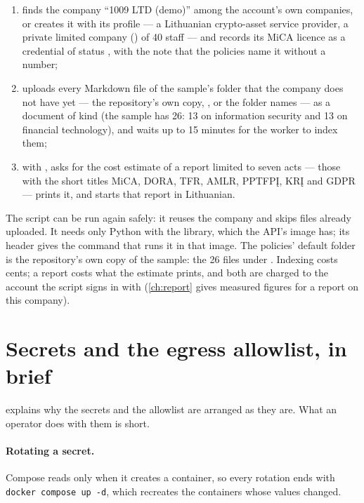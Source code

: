 \begin{enumerate}
  \item finds the company \enquote{1009 LTD (demo)} among the account's own companies, or
    creates it with its profile --- a Lithuanian crypto-asset service provider, a private
    limited company () of 40 staff --- and records its MiCA licence as a credential
    of status , with the note that the policies name it without a number;
  \item uploads every Markdown file of the sample's folder that the company does not have
    yet --- the repository's own copy,
    , or the folder
     names --- as a document of kind  (the sample has 26: 13 on
    information security and 13 on financial technology), and waits up to 15 minutes for the
    worker to index them;
  \item with , asks for the cost estimate of a report limited to seven acts
    --- those with the short titles MiCA, DORA, TFR, AMLR, PPTFPĮ, KRĮ and GDPR --- prints
    it, and starts that report in Lithuanian.
\end{enumerate}

The script can be run again safely: it reuses the company and skips files already uploaded.
It needs only Python with the  library, which the API's image has; its header
gives the command that runs it in that image. The policies' default folder is
the repository's own copy of the sample: the 26 files under
. Indexing
costs cents; a report costs what the estimate prints, and both are charged to the account the
script signs in with (\cref{ch:report} gives measured figures for a report on this company).


\section{Secrets and the egress allowlist, in brief}\label{sec:ops:secrets}

 explains why the secrets and the allowlist are arranged as they are. What
an operator does with them is short.

\paragraph{Rotating a secret.} Compose reads  only when it creates a container, so
every rotation ends with \texttt{docker compose up -d}, which recreates the containers whose
values changed.

